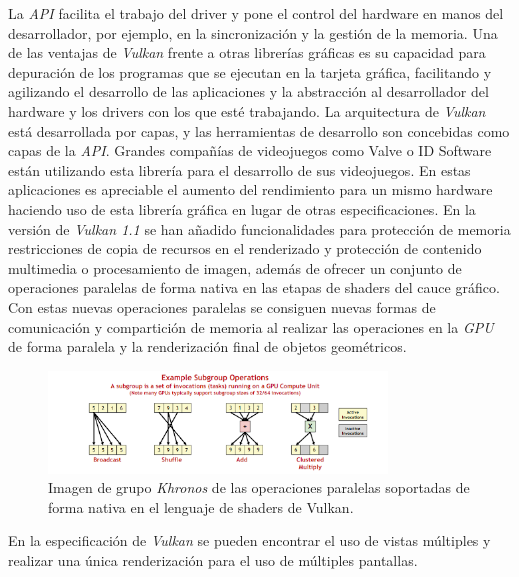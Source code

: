 \documentclass[a4paper]{book}
\begin{document}
La \textit{API} facilita el trabajo del driver y pone el control del hardware en manos del desarrollador, por ejemplo,
en la sincronización y la gestión de la memoria. Una de las ventajas de \textit{Vulkan} frente a otras librerías gráficas
es su capacidad para depuración de los programas que se ejecutan en la tarjeta gráfica, facilitando y agilizando
el desarrollo de las aplicaciones y la abstracción al desarrollador del hardware y los drivers con los que esté
trabajando. La arquitectura de \textit{Vulkan} está desarrollada por capas, y las herramientas de desarrollo son concebidas
como capas de la \textit{API}. Grandes compañías de videojuegos como Valve o ID Software están utilizando esta librería
para el desarrollo de sus videojuegos. En estas aplicaciones es apreciable el aumento del rendimiento para un mismo hardware
haciendo uso de esta librería gráfica en lugar de otras especificaciones. En la versión de \textit{Vulkan 1.1}
se han añadido funcionalidades para protección de memoria restricciones de copia de recursos en el renderizado y protección
de contenido multimedia o procesamiento de imagen, además de ofrecer un conjunto de operaciones paralelas de forma nativa
en las etapas de shaders del cauce gráfico. Con estas nuevas operaciones paralelas se consiguen nuevas formas de comunicación
y compartición de memoria al realizar las operaciones en la \textit{GPU} de forma paralela y la renderización final de objetos 
geométricos. \cite{vulkan:_spec11}

\begin{figure}[H]
    \centering
    \includegraphics[width=9cm, keepaspectratio]{img/vulkan_op.png}
    \caption{Imagen de grupo \textit{Khronos} de las operaciones paralelas soportadas de forma nativa en el lenguaje de shaders de Vulkan.}
    \label{vulkan_op}
\end{figure}

En la especificación de \textit{Vulkan} se pueden encontrar el uso de vistas múltiples y realizar una única renderización
para el uso de múltiples pantallas. 
\end{document}
